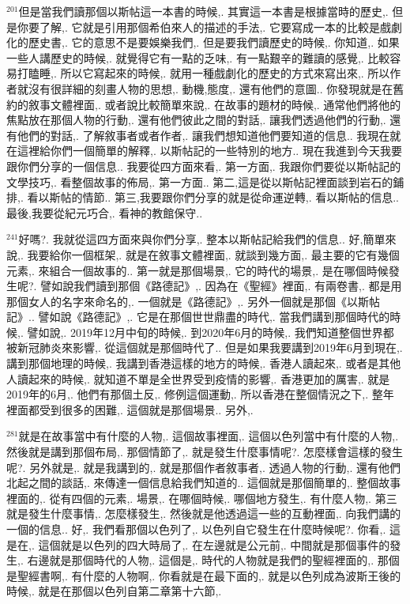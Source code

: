 \documentclass{book}
\begin{document}
$^{201}$但是當我們讀那個以斯帖這一本書的時候,.
其實這一本書是根據當時的歷史,.
但是你要了解,.
它就是引用那個希伯來人的描述的手法,.
它要寫成一本的比較是戲劇化的歷史書,.
它的意思不是要娛樂我們,.
但是要我們讀歷史的時候,.
你知道,.
如果一些人講歷史的時候,.
就覺得它有一點的乏味,.
有一點艱辛的難讀的感覺,.
比較容易打瞌睡,.
所以它寫起來的時候,.
就用一種戲劇化的歷史的方式來寫出來,.
所以作者就沒有很詳細的刻畫人物的思想,.
動機,態度,.
還有他們的意圖..
你發現就是在舊約的敘事文體裡面,.
或者說比較簡單來說,.
在故事的題材的時候,.
通常他們將他的焦點放在那個人物的行動,.
還有他們彼此之間的對話,.
讓我們透過他們的行動,.
還有他們的對話,.
了解敘事者或者作者,.
讓我們想知道他們要知道的信息..
我現在就在這裡給你們一個簡單的解釋,.
以斯帖記的一些特別的地方..
現在我進到今天我要跟你們分享的一個信息..
我要從四方面來看,.
第一方面,.
我跟你們要從以斯帖記的文學技巧,.
看整個故事的佈局,.
第一方面..
第二,這是從以斯帖記裡面談到岩石的鋪排,.
看以斯帖的情節..
第三,我要跟你們分享的就是從命運逆轉,.
看以斯帖的信息..
最後,我要從紀元巧合,.
看神的教館保守..

$^{241}$好嗎?.
我就從這四方面來與你們分享,.
整本以斯帖記給我們的信息..
好,簡單來說,.
我要給你一個框架,.
就是在敘事文體裡面,.
就談到幾方面,.
最主要的它有幾個元素,.
來組合一個故事的..
第一就是那個場景,.
它的時代的場景,.
是在哪個時候發生呢?.
譬如說我們讀到那個《路德記》,.
因為在《聖經》裡面,.
有兩卷書,.
都是用那個女人的名字來命名的,.
一個就是《路德記》,.
另外一個就是那個《以斯帖記》..
譬如說《路德記》,.
它是在那個世世鼎盡的時代,.
當我們講到那個時代的時候,.
譬如說,.
2019年12月中旬的時候,.
到2020年6月的時候,.
我們知道整個世界都被新冠肺炎來影響,.
從這個就是那個時代了..
但是如果我要講到2019年6月到現在,.
講到那個地理的時候,.
我講到香港這樣的地方的時候,.
香港人讀起來,.
或者是其他人讀起來的時候,.
就知道不單是全世界受到疫情的影響,.
香港更加的厲害,.
就是2019年的6月,.
他們有那個土反,.
修例這個運動,.
所以香港在整個情況之下,.
整年裡面都受到很多的困難,.
這個就是那個場景..
另外,.

$^{281}$就是在故事當中有什麼的人物,.
這個故事裡面,.
這個以色列當中有什麼的人物,.
然後就是講到那個布局,.
那個情節了,.
就是發生什麼事情呢?.
怎麼樣會這樣的發生呢?.
另外就是,.
就是我講到的,.
就是那個作者敘事者,.
透過人物的行動,.
還有他們北起之間的談話,.
來傳達一個信息給我們知道的..
這個就是那個簡單的,.
整個故事裡面的,.
從有四個的元素,.
場景,.
在哪個時候,.
哪個地方發生,.
有什麼人物,.
第三就是發生什麼事情,.
怎麼樣發生,.
然後就是他透過這一些的互動裡面,.
向我們講的一個的信息..
好,.
我們看那個以色列了,.
以色列自它發生在什麼時候呢?.
你看,.
這是在,.
這個就是以色列的四大時局了,.
在左邊就是公元前,.
中間就是那個事件的發生,.
右邊就是那個時代的人物,.
這個是,.
時代的人物就是我們的聖經裡面的,.
那個是聖經書啊,.
有什麼的人物啊,.
你看就是在最下面的,.
就是以色列成為波斯王後的時候,.
就是在那個以色列自第二章第十六節,.
\end{document}
